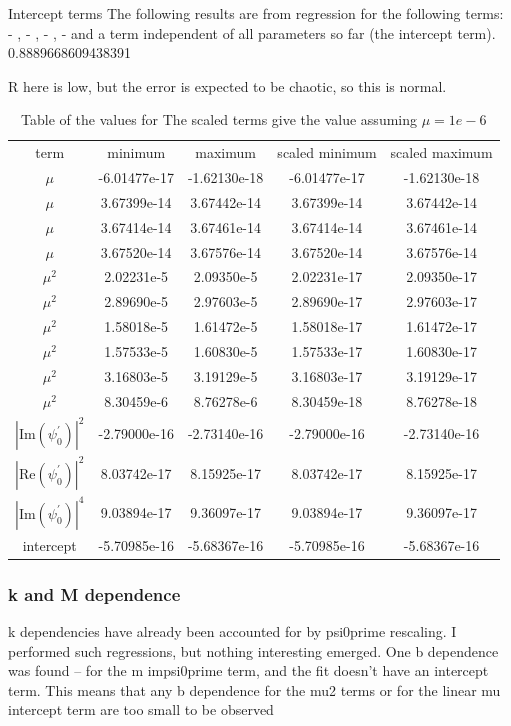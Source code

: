 \documentclass[A4,12pt,oneside]{article}
\renewcommand{\(}{\left(}
\renewcommand{\)}{\right)}
\begin{document}
Intercept terms
The following results are from regression for the following terms: 
 - , 
 - ,
 - ,
 - and a term independent of all parameters so far (the intercept term).
0.8889668609438391

R here is low, but the error is expected to be chaotic, so this is normal.

\begin{table}
\begin{center}
\begin{tabular}{ c c c c c }
 term      & minimum      & maximum      & scaled minimum & scaled maximum \\ 
 $\mu$     &  -6.01477e-17  &  -1.62130e-18  &  -6.01477e-17   &  -1.62130e-18\\  
 $\mu$   &  3.67399e-14  &  3.67442e-14  &  3.67399e-14   &  3.67442e-14\\  
 $\mu$ & 3.67414e-14 & 3.67461e-14 & 3.67414e-14   & 3.67461e-14\\
 $\mu$     &  3.67520e-14  &  3.67576e-14  &  3.67520e-14   &  3.67576e-14\\
 \hline  
 $\mu^2$   & 2.02231e-5 &2.09350e-5&2.02231e-17 &2.09350e-17\\
 $\mu^2$   &2.89690e-5 &2.97603e-5&2.89690e-17 &2.97603e-17\\
 $\mu^2$   &1.58018e-5 &1.61472e-5&1.58018e-17 &1.61472e-17\\
 $\mu^2$   &1.57533e-5 &1.60830e-5&1.57533e-17 &1.60830e-17\\
 $\mu^2$   &3.16803e-5 &3.19129e-5&3.16803e-17 &3.19129e-17\\
 $\mu^2$   &8.30459e-6 &8.76278e-6&8.30459e-18 &8.76278e-18\\
 \hline 
 $|\mathrm{Im} (\psi^\prime_0)|^2$ & -2.79000e-16 & -2.73140e-16 & -2.79000e-16  & -2.73140e-16\\
 $|\mathrm{Re} (\psi^\prime_0)|^2$  &  8.03742e-17  &   8.15925e-17  &  8.03742e-17 &   8.15925e-17\\  
 $|\mathrm{Im} (\psi^\prime_0)|^4$   &  9.03894e-17  & 9.36097e-17  &  9.03894e-17 &  9.36097e-17\\  
 intercept & -5.70985e-16 & -5.68367e-16 & -5.70985e-16   & -5.68367e-16
\end{tabular}
\end{center}
\caption{
Table of the values for 
The scaled terms give the value assuming $\mu = 1e-6$
}
\end{table}


\subsubsection{k and M dependence}
k dependencies have already been accounted for by psi0prime rescaling. I performed such regressions, but nothing interesting emerged. One b dependence was found -- for the m impsi0prime term, and the fit doesn't have an intercept term. This means that any b dependence for the mu2 terms or for the linear mu intercept term are too small to be observed
\end{document}
